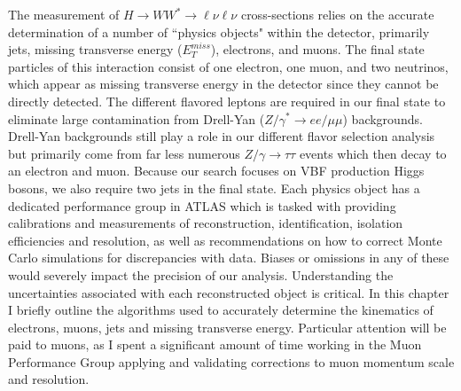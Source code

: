 The measurement of $H\rightarrow WW^*\rightarrow \ell\nu\ell\nu$ cross-sections relies on the accurate determination of a number of ``physics objects" within the detector, primarily jets, missing transverse energy ($E_T^{miss}$), electrons, and muons. The final state particles of this interaction consist of one electron, one muon, and two neutrinos, which appear as missing transverse energy in the detector since they cannot be directly detected. The different flavored leptons are required in our final state to eliminate large contamination from Drell-Yan ($Z/\gamma^*\rightarrow ee/\mu\mu$) backgrounds. Drell-Yan backgrounds still play a role in our different flavor selection analysis but primarily come from far less numerous $Z/\gamma\rightarrow\tau\tau$ events which then decay to an electron and muon. Because our search focuses on VBF production Higgs bosons, we also require two jets in the final state. Each physics object has a dedicated performance group in ATLAS which is tasked with providing calibrations and measurements of reconstruction, identification, isolation efficiencies and resolution, as well as recommendations on how to correct Monte Carlo simulations for discrepancies with data. Biases or omissions in any of these would severely impact the precision of our analysis. Understanding the uncertainties associated with each reconstructed object is critical. In this chapter I briefly outline the algorithms used to accurately determine the kinematics of electrons, muons, jets and missing transverse energy. Particular attention will be paid to muons, as I spent a significant amount of time working in the Muon Performance Group applying and validating corrections to muon momentum scale and resolution. 

